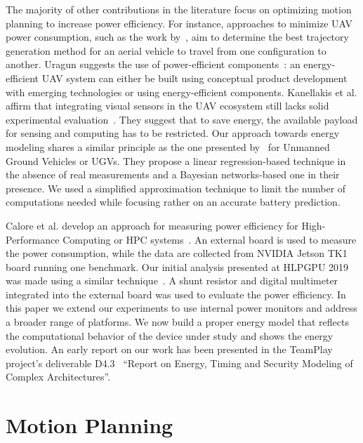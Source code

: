 The majority of other contributions in the literature focus on optimizing motion planning to increase power efficiency. For instance, approaches to minimize UAV power consumption, such as the work by~\citep{kreciglowa2017energy}, aim to determine the best trajectory generation method for an aerial vehicle to travel from one configuration to another. Uragun suggests the use of power-efficient components~\citep{uragun2011energy}: an energy-efficient UAV system can either be built using conceptual product development with emerging technologies or using energy-efficient components. Kanellakis et al. affirm that integrating visual sensors in the UAV ecosystem still lacks solid experimental evaluation~\citep{kanellakis2017survey}. They suggest that to save energy, the available payload for sensing and computing has to be restricted. Our approach towards energy modeling shares a similar principle as the one presented by~\citep{sadrpour2013mission, sadrpour2013experimental} for Unmanned Ground Vehicles or UGVs. They propose a linear regression-based technique in the absence of real measurements and a Bayesian networks-based one in their presence. We used a simplified approximation technique to limit the number of computations needed while focusing rather on an accurate battery prediction.


Calore et al. develop an approach for measuring power efficiency for High-Performance Computing or HPC systems~\citep{calore2015energy}. An external board is used to measure the power consumption, while the data are collected from NVIDIA Jetson TK1 board running one benchmark. Our initial analysis presented at HLPGPU 2019 was made using a similar technique~\citep{seewald2019hlpgpu}. A shunt resistor and digital multimeter integrated into the external board was used to evaluate the power efficiency. In this paper we extend our experiments to use internal power monitors and address a broader range of platforms. We now build a proper energy model that reflects the computational behavior of the device under study and shows the energy evolution. An early report on our work has been presented in the TeamPlay project's deliverable D4.3~\citep{teamplay} ``Report on Energy, Timing and Security Modeling of Complex Architectures''.


\section{\color{cyan}Motion Planning}
\label{sec:soa-motion-pl}

